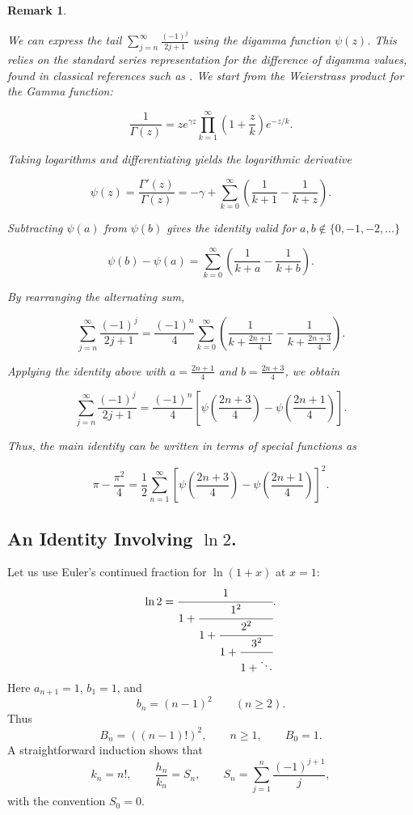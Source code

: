 \documentclass[]{interact}
\theoremstyle{plain}
\numberwithin{equation}{section} %
\newtheorem{remark}[thm]{Remark}
\numberwithin{table}{section} %
\numberwithin{figure}{section}
\begin{document}
\begin{remark}\label{rk6}

We can express the tail $\sum_{j=n}^\infty \frac{(-1)^j}{2j+1}$ using the digamma function $\psi(z)$. This relies on the standard series representation for the difference of digamma values, found in classical references such as \cite{abramowitz1965handbook}. We start from the Weierstrass product for the Gamma function:

$$\frac{1}{\Gamma(z)} = z e^{\gamma z}\prod_{k=1}^{\infty}\left(1+\frac{z}{k}\right)e^{-z/k}.$$


Taking logarithms and differentiating yields the logarithmic derivative

$$\psi(z)=\frac{\Gamma'(z)}{\Gamma(z)}=-\gamma+\sum_{k=0}^{\infty}\left(\frac{1}{k+1}-\frac{1}{k+z}\right).$$

Subtracting $\psi(a)$ from $\psi(b)$ gives the identity valid for $a,b \notin \{0,-1,-2,\dots\}$

$$\psi(b)-\psi(a)=\sum_{k=0}^{\infty}\left(\frac{1}{k+a}-\frac{1}{k+b}\right).$$

By rearranging the alternating sum,

$$\sum_{j=n}^\infty \frac{(-1)^j}{2j+1} = \frac{(-1)^n}{4} \sum_{k=0}^\infty \left( \frac{1}{k + \frac{2n+1}{4}} - \frac{1}{k + \frac{2n+3}{4}} \right).$$

Applying the identity above with $a=\frac{2n+1}{4}$ and $b=\frac{2n+3}{4}$, we obtain

$$\sum_{j=n}^\infty \frac{(-1)^j}{2j+1} = \frac{(-1)^n}{4} \left[ \psi\left(\frac{2n+3}{4}\right) - \psi\left(\frac{2n+1}{4}\right) \right].$$

Thus, the main identity can be written in terms of special functions as

$$\pi - \frac{\pi^2}{4} = \frac{1}{2} \sum_{n=1}^\infty \left[ \psi\left(\frac{2n+3}{4}\right) - \psi\left(\frac{2n+1}{4}\right) \right]^2.$$



    
\end{remark}





\subsection{An Identity Involving $\ln 2$.}


Let us use Euler's continued fraction \cite{euler1785transformatione} for
\(\ln(1+x)\) at \(x=1\):
\[
\ln 2
=
\cfrac{1}{1+\cfrac{1^2}{1+\cfrac{2^2}{1+\cfrac{3^2}{1+\ddots}}}}.
\]
Here \(a_{n+1}=1\), \(b_1=1\), and
\[
b_n=(n-1)^2\qquad (n\ge2).
\]
Thus
\[
B_n=((n-1)!)^2,\qquad n\ge1,
\qquad B_0=1.
\]
A straightforward induction shows that
\[
k_n=n!,
\qquad
\frac{h_n}{k_n}=S_n,
\qquad
S_n=\sum_{j=1}^{n}\frac{(-1)^{j+1}}{j},
\]
with the convention \(S_0=0\).
\end{document}
